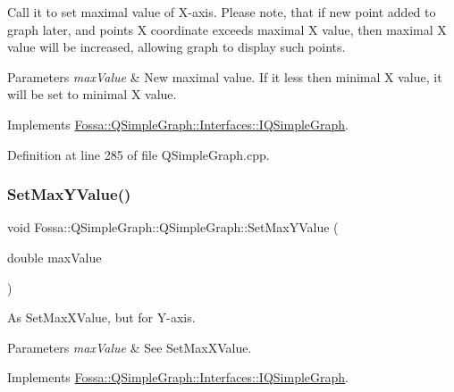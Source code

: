 Call it to set maximal value of X-\/axis. Please note, that if new point added to graph later, and point\textquotesingle{}s X coordinate exceeds maximal X value, then maximal X value will be increased, allowing graph to display such points. 


\begin{DoxyParams}{Parameters}
{\em max\+Value} & New maximal value. If it less then minimal X value, it will be set to minimal X value. \\
\hline
\end{DoxyParams}


Implements \hyperlink{class_fossa_1_1_q_simple_graph_1_1_interfaces_1_1_i_q_simple_graph_a04e7ec46c2be46257bef53c7bf978a2a}{Fossa\+::\+Q\+Simple\+Graph\+::\+Interfaces\+::\+I\+Q\+Simple\+Graph}.



Definition at line 285 of file Q\+Simple\+Graph.\+cpp.

\mbox{\label{class_fossa_1_1_q_simple_graph_1_1_q_simple_graph_a6cb6eee80dc489f300e32263833cf1cd}} 
\subsubsection{\texorpdfstring{Set\+Max\+Y\+Value()}{SetMaxYValue()}}
{\footnotesize\ttfamily void Fossa\+::\+Q\+Simple\+Graph\+::\+Q\+Simple\+Graph\+::\+Set\+Max\+Y\+Value (\begin{DoxyParamCaption}\item[{double}]{max\+Value }\end{DoxyParamCaption})\hspace{0.3cm}{\ttfamily [virtual]}}



As Set\+Max\+X\+Value, but for Y-\/axis. 


\begin{DoxyParams}{Parameters}
{\em max\+Value} & See Set\+Max\+X\+Value. \\
\hline
\end{DoxyParams}


Implements \hyperlink{class_fossa_1_1_q_simple_graph_1_1_interfaces_1_1_i_q_simple_graph_a09e04c116810e79ca1663d2075477746}{Fossa\+::\+Q\+Simple\+Graph\+::\+Interfaces\+::\+I\+Q\+Simple\+Graph}.



